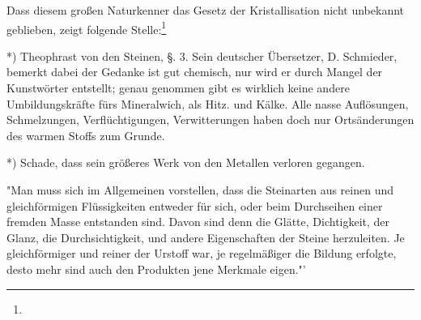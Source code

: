 \documentclass[a4paper, 11pt, oneside, polutonikogreek, german]{article}
\begin{document}
Dass diesem großen Naturkenner das Gesetz der Kristallisation nicht unbekannt geblieben, zeigt folgende Stelle:\footnote{}

*) Theophrast von den Steinen, §. 3. Sein deutscher Übersetzer, D. Schmieder, bemerkt dabei der Gedanke ist gut chemisch, nur wird er durch Mangel der Kunstwörter entstellt; genau genommen gibt es wirklich keine andere Umbildungskräfte fürs Mineralwich, als Hitz. und Kälke. Alle nasse Auflösungen, Schmelzungen, Verflüchtigungen, Verwitterungen haben doch nur Ortsänderungen des warmen Stoffs zum Grunde.

*) Schade, dass sein größeres Werk von den Metallen verloren gegangen.

"Man muss sich im Allgemeinen vorstellen, dass die Steinarten aus reinen und gleichförmigen Flüssigkeiten entweder für sich, oder beim Durchseihen einer fremden Masse entstanden sind. Davon sind denn die Glätte, Dichtigkeit, der Glanz, die Durchsichtigkeit, und andere Eigenschaften der Steine herzuleiten. Je gleichförmiger und reiner der Urstoff war, je regelmäßiger die Bildung erfolgte, desto mehr sind auch den Produkten jene Merkmale eigen."'
\end{document}

